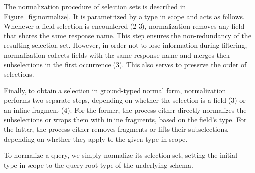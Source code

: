 


The normalization procedure of selection sets is described in
Figure~\ref{fig:normalize}. It is parametrized by a type in scope and
acts as follows. Whenever a field selection is encountered (2-3),
normalization removes any field that shares the same response
name. This step ensures the non-redundancy of the resulting selection
set.  However, in order not to lose information during filtering,
normalization collects fields with the same response name and merges
their subselections in the first occurrence (3). This also serves to
preserve the order of selections.

Finally, to obtain a selection in ground-typed normal form,
normalization performs two separate steps, depending on whether the
selection is a field (3) or an inline fragment (4). For the former,
the process either directly normalizes the subselections or wraps them
with inline fragments, based on the field's type.  For the latter, the
process either removes fragments or lifts their subselections,
depending on whether they apply to the given type in scope.

To normalize a query, we simply normalize its selection set, setting
the initial type in scope to the  query root type of the underlying
schema.

